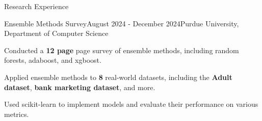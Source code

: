 \documentclass[
    11pt, %
]{resume} %
\begin{document}
\vspace*{-0.3cm}
\begin{rSection}{Research Experience}
  \begin{rSubsection}{Ensemble Methods Survey}{August 2024 - December 2024}{Purdue University, Department of Computer Science}{}
  \item Conducted a \textbf{12 page} page survey of ensemble methods, including random forests, adaboost, and xgboost.
  \item Applied ensemble methods to \textbf{8} real-world datasets, including the \textbf{Adult dataset}, \textbf{bank marketing dataset}, and more.
  \item Used scikit-learn to implement models and evaluate their performance on various metrics.
  \end{rSubsection}
\end{rSection}
\end{document}
